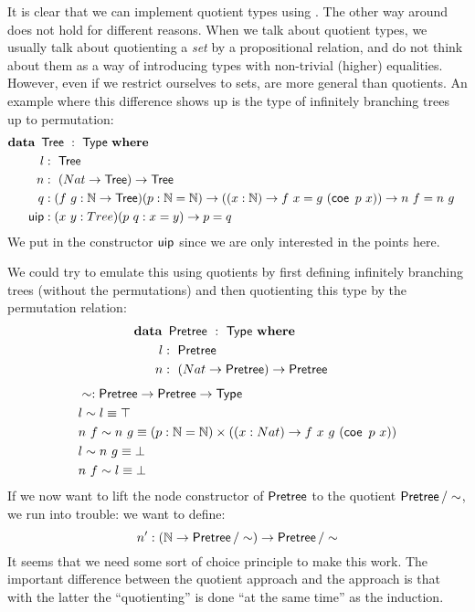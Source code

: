 \documentclass[a4paper,10pt]{article}
\begin{document}
It is clear that we can implement quotient types using \hits. The
other way around does not hold for different reasons. When we talk
about quotient types, we usually talk about quotienting a \emph{set}
by a propositional relation, and do not think about them as a way of
introducing types with non-trivial (higher) equalities. However, even
if we restrict ourselves to sets, \hits are more general than
quotients. An example where this difference shows up is the type of
infinitely branching trees up to permutation:
%
\begin{alignat*}{2}
  &\rlap{$\data\ \Tree\ :\ \Type\ \where$} \\
  &&\ \ l     &:\ \Tree \\
  &&\ \ n     &:\ (Nat \to \Tree) \to \Tree \\
  &&\ \ q     &:(f\ g : \Nat \to \Tree) (p : \Nat = \Nat) \to ((x : \Nat) \to f\ x = g\ (\coe\ p\ x)) \to n\ f = n\ g \\
  &&\ \ \uipc &:(x\ y : Tree) (p\ q : x = y) \to p = q
\end{alignat*}
%
We put in the constructor $\operatorname{\mathsf{uip}}$ since we are only interested in the points here.

We could try to emulate this \hit using quotients by first defining
infinitely branching trees (without the permutations) and then
quotienting this type by the permutation relation:
%
\begin{alignat*}{2}
  &\rlap{$\data\ \Pretree\ :\ \Type\ \where$} \\
  &&\ \ l     &:\ \Pretree \\
  &&\ \ n     &:\ (Nat \to \Pretree) \to \Pretree \\
\end{alignat*}
%
\begin{align*}
  &\sim : \Pretree \to \Pretree \to \Type \\
  &l \sim l \defeq \top \\
  &n\ f \sim n\ g \defeq (p : \Nat = \Nat) \times ((x : Nat) \to f\ x ~ g\ (\coe\ p\ x)) \\
  &l \sim n\ g \defeq \bot \\
  &n\ f \sim l \defeq \bot
\end{align*}
%
If we now want to lift the node constructor of $\operatorname{\mathsf{Pretree}}$ to the
quotient $\operatorname{\mathsf{Pretree}}/\sim$, we run into trouble: we want to define:
$$
n' : (\mathbb{N} \to \operatorname{\mathsf{Pretree}}/\sim) \to \operatorname{\mathsf{Pretree}}/\sim
$$
It seems that we need some sort of choice principle to make this
work. The important difference between the quotient approach and the
\hit approach is that with the latter the ``quotienting'' is done ``at
the same time'' as the induction.
\end{document}
